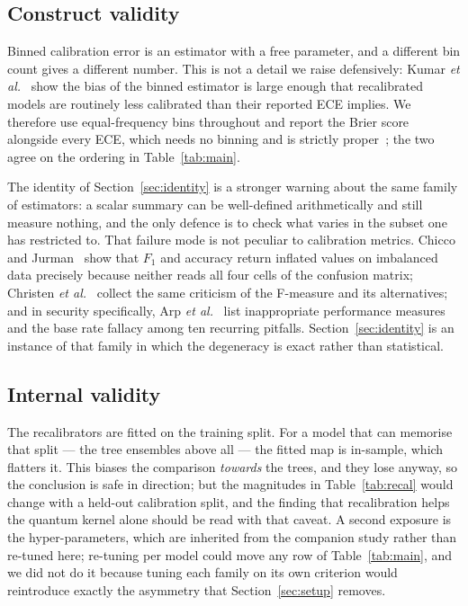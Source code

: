 \documentclass[journal]{IEEEtran}
\begin{document}
\subsection{Construct validity}
Binned calibration error is an estimator with a free parameter, and a
different bin count gives a different number. This is not a detail we
raise defensively: Kumar \emph{et al.}~\cite{kumar2019verified} show the
bias of the binned estimator is large enough that recalibrated models are
routinely less calibrated than their reported ECE implies. We therefore use
equal-frequency bins throughout and report the Brier score alongside every
ECE, which needs no binning and is strictly
proper~\cite{gneiting2007scoring}; the two agree on the ordering in
Table~\ref{tab:main}.

The identity of Section~\ref{sec:identity} is a stronger warning about the
same family of estimators: a scalar summary can be well-defined
arithmetically and still measure nothing, and the only defence is to check
what varies in the subset one has restricted to. That failure mode is not
peculiar to calibration metrics. Chicco and
Jurman~\cite{chicco2020advantages} show that $F_1$ and accuracy return
inflated values on imbalanced data precisely because neither reads all four
cells of the confusion matrix; Christen \emph{et
al.}~\cite{christen2023review} collect the same criticism of the F-measure
and its alternatives; and in security specifically, Arp \emph{et
al.}~\cite{arp2022dosdonts} list inappropriate performance measures and the
base rate fallacy among ten recurring pitfalls. Section~\ref{sec:identity}
is an instance of that family in which the degeneracy is exact rather than
statistical.

\subsection{Internal validity}
The recalibrators are fitted on the training split. For a model that can
memorise that split --- the tree ensembles above all --- the fitted map is
in-sample, which flatters it. This biases the comparison \emph{towards} the
trees, and they lose anyway, so the conclusion is safe in direction; but the
magnitudes in Table~\ref{tab:recal} would change with a held-out
calibration split, and the finding that recalibration helps the quantum
kernel alone should be read with that caveat. A second exposure is the
hyper-parameters, which are inherited from the companion study rather than
re-tuned here; re-tuning per model could move any row of
Table~\ref{tab:main}, and we did not do it because tuning each family on its
own criterion would reintroduce exactly the asymmetry that
Section~\ref{sec:setup} removes.
\end{document}
